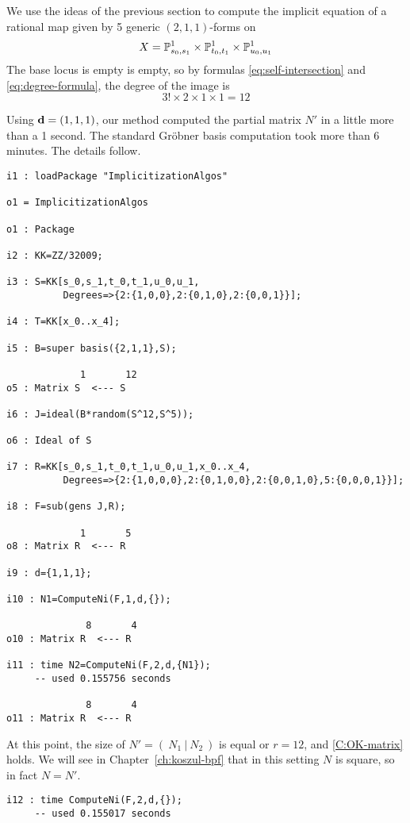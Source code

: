 \documentclass[fleqn,reqno]{amsart}
\numberwithin{first}{chapter}
\begin{document}
\begin{example}[$\mt{ex601}$]
\label{ex601}
We use the ideas of the previous section to compute the implicit equation
of a rational map given by 5 generic $(2,1,1)$-forms on
\[
	X=\mathbb{P}^1_{s_0,s_1}\times\mathbb{P}^1_{t_0,t_1}\times\mathbb{P}^1_{u_0,u_1}
\]
The base locus is empty is empty,
so by formulas \eqref{eq:self-intersection} and \eqref{eq:degree-formula},
the degree of the image is
\[
	3!\times2\times1\times1=12
\]

Using $\mathbf d=(1,1,1)$,
our method computed the partial matrix $N'$ in a little more than a 1 second.
The standard Gr\"obner basis computation took more than 6 minutes.
The details follow.

\begin{verbatim}
i1 : loadPackage "ImplicitizationAlgos"

o1 = ImplicitizationAlgos

o1 : Package

i2 : KK=ZZ/32009;

i3 : S=KK[s_0,s_1,t_0,t_1,u_0,u_1,
          Degrees=>{2:{1,0,0},2:{0,1,0},2:{0,0,1}}];

i4 : T=KK[x_0..x_4];

i5 : B=super basis({2,1,1},S);

             1       12
o5 : Matrix S  <--- S

i6 : J=ideal(B*random(S^12,S^5));

o6 : Ideal of S

i7 : R=KK[s_0,s_1,t_0,t_1,u_0,u_1,x_0..x_4,
          Degrees=>{2:{1,0,0,0},2:{0,1,0,0},2:{0,0,1,0},5:{0,0,0,1}}];

i8 : F=sub(gens J,R);

             1       5
o8 : Matrix R  <--- R

i9 : d={1,1,1};

i10 : N1=ComputeNi(F,1,d,{});

              8       4
o10 : Matrix R  <--- R

i11 : time N2=ComputeNi(F,2,d,{N1});
     -- used 0.155756 seconds

              8       4
o11 : Matrix R  <--- R
\end{verbatim}

At this point, the size of $N'=(~N_1~|~N_2~)$ is equal or $r=12$,
and \eqref{C:OK-matrix} holds.
We will see in Chapter~\ref{ch:koszul-bpf} that in this setting $N$ is square,
so in fact $N=N'$.

\begin{verbatim}
i12 : time ComputeNi(F,2,d,{});
     -- used 0.155017 seconds


\end{verbatim}
\end{example}
\end{document}
